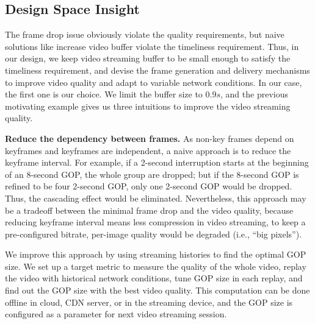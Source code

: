 \subsection{Design Space Insight}
The frame drop issue obviously violate the quality requirements, but naive solutions like increase video buffer violate the timeliness requirement. Thus, in our design, we keep video streaming buffer to be small enough to satisfy the timeliness requirement, and devise the frame generation and delivery mechanisms to improve video quality and adapt to variable network conditions. In our case, the first one is our choice. We limit the buffer size to $0.9s$, and the previous motivating example gives us three intuitions to improve the video streaming quality.


\textbf{Reduce the dependency between frames.}
As non-key frames depend on keyframes and keyframes are independent, a naive approach is to reduce the keyframe interval. For example, if a 2-second interruption starts at the beginning of an 8-second GOP, the whole group are dropped; but if the 8-second GOP is refined to be four 2-second GOP, only one 2-second GOP would be dropped. Thus, the cascading effect would be eliminated. Nevertheless, this approach may be a tradeoff between the minimal frame drop and the video quality, because reducing keyframe interval means less compression in video streaming, to keep a pre-configured bitrate, per-image quality would be degraded (i.e., ``big pixels'').

We improve this approach by using streaming histories to find the optimal GOP size. We set up a target metric to measure the quality of the whole video, replay the video with historical network conditions, tune GOP size in each replay, and find out the GOP size with the best video quality. This computation can be done offline in cloud, CDN server, or in the streaming device, and the GOP size is configured as a parameter for next video streaming session.

